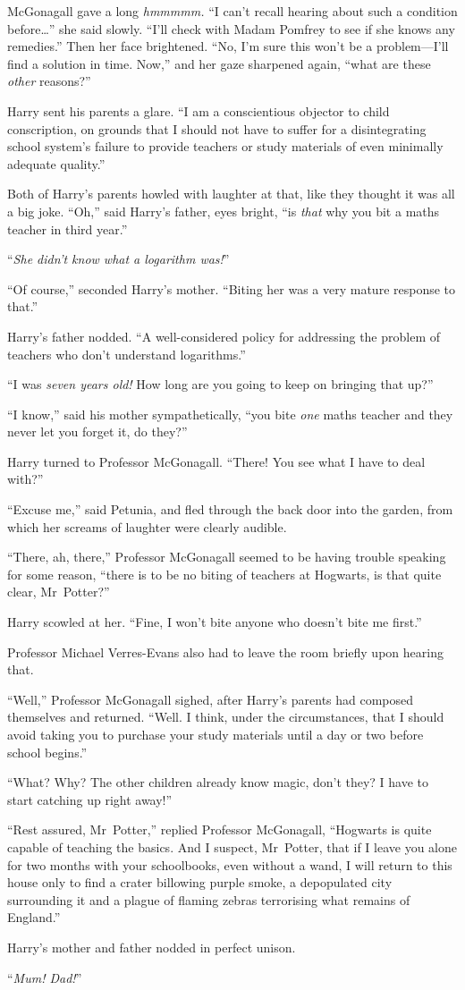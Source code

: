 McGonagall gave a long \emph{hmmmmm.} “I can’t recall hearing about such a condition before…” she said slowly. “I’ll check with Madam Pomfrey to see if she knows any remedies.” Then her face brightened. “No, I’m sure this won’t be a problem—I’ll find a solution in time. Now,” and her gaze sharpened again, “what are these \emph{other} reasons?”

Harry sent his parents a glare. “I am a conscientious objector to child conscription, on grounds that I should not have to suffer for a disintegrating school system’s failure to provide teachers or study materials of even minimally adequate quality.”

Both of Harry’s parents howled with laughter at that, like they thought it was all a big joke. “Oh,” said Harry’s father, eyes bright, “is \emph{that} why you bit a maths teacher in third year.”

“\emph{She didn’t know what a logarithm was!}”

“Of course,” seconded Harry’s mother. “Biting her was a very mature response to that.”

Harry’s father nodded. “A well-considered policy for addressing the problem of teachers who don’t understand logarithms.”

“I was \emph{seven years old!} How long are you going to keep on bringing that up?”

“I know,” said his mother sympathetically, “you bite \emph{one} maths teacher and they never let you forget it, do they?”

Harry turned to Professor McGonagall. “There! You see what I have to deal with?”

“Excuse me,” said Petunia, and fled through the back door into the garden, from which her screams of laughter were clearly audible.

“There, ah, there,” Professor McGonagall seemed to be having trouble speaking for some reason, “there is to be no biting of teachers at Hogwarts, is that quite clear, Mr~Potter?”

Harry scowled at her. “Fine, I won’t bite anyone who doesn’t bite me first.”

Professor Michael Verres-Evans also had to leave the room briefly upon hearing that.

“Well,” Professor McGonagall sighed, after Harry’s parents had composed themselves and returned. “Well. I think, under the circumstances, that I should avoid taking you to purchase your study materials until a day or two before school begins.”

“What? Why? The other children already know magic, don’t they? I have to start catching up right away!”

“Rest assured, Mr~Potter,” replied Professor McGonagall, “Hogwarts is quite capable of teaching the basics. And I suspect, Mr~Potter, that if I leave you alone for two months with your schoolbooks, even without a wand, I will return to this house only to find a crater billowing purple smoke, a depopulated city surrounding it and a plague of flaming zebras terrorising what remains of England.”

Harry’s mother and father nodded in perfect unison.

“\emph{Mum! Dad!}”

